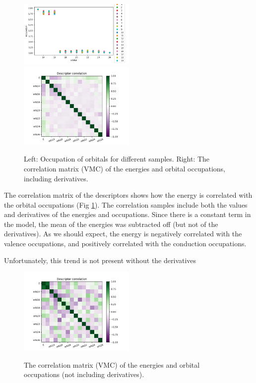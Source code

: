 \begin{figure}[h!]
\includegraphics[width=0.5\textwidth]{images/vmc_lowen_descriptors.png}
\includegraphics[width=0.5\textwidth]{images/vmc_allderivs_lowen_corrmat.png}
\label{fig:descriptors}
\caption{Left: Occupation of orbitals for different samples. Right: The correlation matrix (VMC) of the energies and orbital occupations, including derivatives.}
\end{figure}

The correlation matrix of the descriptors shows how the energy is correlated with the orbital occupations (Fig \ref{fig:descriptors}).
The correlation samples include both the values and derivatives of the energies and occupations.
Since there is a constant term in the model, the mean of the energies was subtracted off (but not of the derivatives).
As we should expect, the energy is negatively correlated with the valence occupations, and positively correlated with the conduction occupations.

Unfortunately, this trend is not present without the derivatives
\begin{figure}[h!]
\includegraphics[width=0.5\textwidth]{images/vmc_lowen_corrmat.png}
\label{fig:descriptors_noderivs}
\caption{The correlation matrix (VMC) of the energies and orbital occupations (not including derivatives).}
\end{figure}

